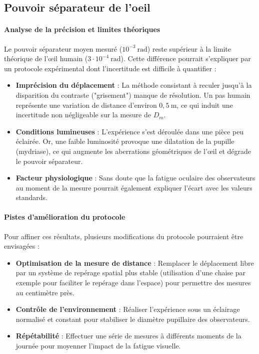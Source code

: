 \subsection{Pouvoir séparateur de l'oeil}

\paragraph{Analyse de la précision et limites théoriques}
Le pouvoir séparateur moyen mesuré ($10^{-3} \mathrm{~rad}$) reste supérieur à la limite théorique de l'œil humain ($3 \cdot 10^{-4} \mathrm{~rad}$). 
Cette différence pourrait s'expliquer par un protocole expérimental dont l'incertitude est difficile à quantifier :
\begin{itemize}
    \item \textbf{Imprécision du déplacement} : La méthode consistant à reculer jusqu'à la disparition du contraste ("grisement") manque de résolution. Un pas humain représente une variation de distance d'environ $0,5 \mathrm{~m}$, ce qui induit une incertitude non négligeable sur la mesure de $D_m$.
    \item \textbf{Conditions lumineuses} : L'expérience s'est déroulée dans une pièce peu éclairée. Or, une faible luminosité provoque une dilatation de la pupille (mydriase), ce qui augmente les aberrations géométriques de l'œil et dégrade le pouvoir séparateur.
    \item \textbf{Facteur physiologique} : Sans doute que la fatigue oculaire des observateurs au moment de la mesure pourrait également expliquer l'écart avec les valeurs standards.
\end{itemize}

\paragraph{Pistes d'amélioration du protocole}
Pour affiner ces résultats, plusieurs modifications du protocole pourraient être envisagées :
\begin{itemize}
    \item \textbf{Optimisation de la mesure de distance} : Remplacer le déplacement libre par un système de repérage spatial plus stable (utilisation d'une chaise par exemple pour faciliter le repérage dans l'espace) pour permettre des mesures au centimètre près.
    \item \textbf{Contrôle de l'environnement} : Réaliser l'expérience sous un éclairage normalisé et constant pour stabiliser le diamètre pupillaire des observateurs.
    \item \textbf{Répétabilité} : Effectuer une série de mesures à différents moments de la journée pour moyenner l'impact de la fatigue visuelle.
\end{itemize}

